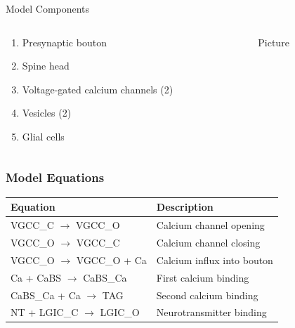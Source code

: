 \documentclass{beamer}
\begin{document}
\begin{frame}{Model Components}
\begin{columns}
    \begin{column}{0.47\textwidth}
\begin{enumerate} 
    \item Presynaptic bouton 
    \item Spine head
    \item Voltage-gated calcium channels (2)
    \item Vesicles (2)
    \item Glial cells
\end{enumerate}
    \end{column}
    \begin{column}{0.5\textwidth}
        Picture
    \end{column}
\end{columns}
\end{frame}


\frame
{
    \frametitle{Model Equations}
\begin{table}[H]
\begin{tabular}{ll}
Equation & Description \\ \hline
VGCC\_C $\to$ VGCC\_O & Calcium channel opening \\
VGCC\_O $\to$ VGCC\_C & Calcium channel closing \\
VGCC\_O $\to$ VGCC\_O + Ca & Calcium influx into bouton \\
Ca + CaBS $\to$ CaBS\_Ca & First calcium binding \\ 
CaBS\_Ca + Ca $\to$ TAG & Second calcium binding \\
NT + LGIC\_C $\to$ LGIC\_O& Neurotransmitter binding \\
\end{tabular} 
\end{table}

}
\end{document}

